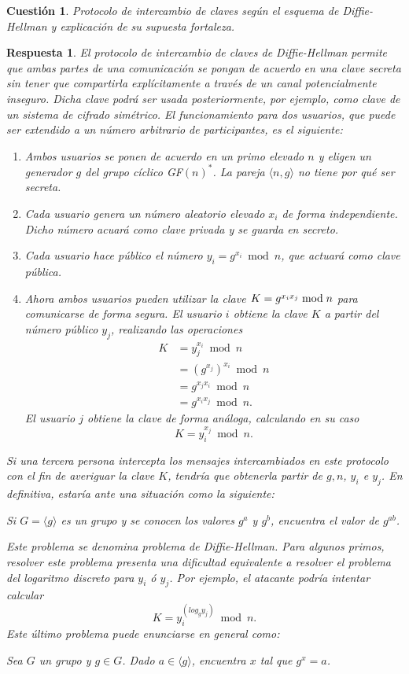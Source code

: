 \documentclass[
  a4paper,
  spanish,
  12pt,
]{scrartcl}
\theoremstyle{ejercicio-style}
\newtheorem{ejer}{Cuestión}
\theoremstyle{remark-style}
\newtheorem*{sol}{Respuesta}
\theoremstyle{teorema-style}
\begin{document}
\begin{ejer}
  Protocolo de intercambio de claves según el esquema de Diffie-Hellman y explicación de su supuesta fortaleza.
\end{ejer}

\begin{sol}
  El protocolo de intercambio de claves de Diffie-Hellman permite que ambas partes de una comunicación se pongan de acuerdo en una clave secreta sin tener que compartirla explícitamente a través de un canal potencialmente inseguro. Dicha clave podrá ser usada posteriormente, por ejemplo, como clave de un sistema de cifrado simétrico.
  El funcionamiento para dos usuarios, que puede ser extendido a un número arbitrario de participantes, es el siguiente:
  \begin{enumerate}
    \item Ambos usuarios se ponen de acuerdo en un primo elevado $n$ y eligen un generador $g$ del grupo cíclico GF$(n)^\ast$. La pareja $\langle n, g \rangle$ no tiene por qué ser secreta.
    \item Cada usuario genera un número aleatorio elevado \(x_i\) de forma independiente. Dicho número acuará como \textit{clave privada} y se guarda en secreto.
    \item Cada usuario hace público el número $y_i = g^{x_i} \bmod n$, que actuará como \textit{clave pública}.
    \item Ahora ambos usuarios pueden utilizar la clave \(K = \cramped{g^{x_ix_j}} \bmod n\) para comunicarse de forma segura.
    El usuario \(i\) obtiene la clave \(K\) a partir del número público \(y_j\), realizando las operaciones \begin{align*}
      K &= y_j^{x_i} \bmod n \\
        &= (g^{x_j})^{x_i} \bmod n \\
        &= g^{x_jx_i} \bmod n \\
        &= g^{x_ix_j} \bmod n.
    \end{align*}
    El usuario \(j\) obtiene la clave de forma análoga, calculando en su caso \[K = y_i^{x_j} \bmod n.\]
  \end{enumerate}

  Si una tercera persona intercepta los mensajes intercambiados en este protocolo con el fin de averiguar la clave \(K\), tendría que obtenerla partir de $g, n$, \(y_i\) e \(y_j\). En definitiva, estaría ante una situación como la siguiente:
  \begin{displayquote}
    Si \(G = \langle g \rangle\) es un grupo y se conocen los valores $g^a$ y $g^b$, encuentra el valor de $g^{ab}$.
  \end{displayquote}
  Este problema se denomina \textit{problema de Diffie-Hellman}.
  Para algunos primos, resolver este problema presenta una dificultad equivalente a resolver el \textit{problema del logaritmo discreto} para \(y_i\) ó \(y_j\). Por ejemplo, el atacante podría intentar calcular \[K = y_i^{\left(log_{g} y_j\right)} \bmod n.\] Este último problema puede enunciarse en general como: \begin{displayquote}
    Sea \(G\) un grupo y \(g \in G\). Dado \(a \in \langle g \rangle\), encuentra \(x\) tal que \(g^x = a\).
  \end{displayquote}


\end{sol}
\end{document}
